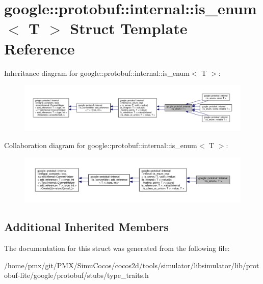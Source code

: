 \hypertarget{structgoogle_1_1protobuf_1_1internal_1_1is__enum}{}\section{google\+:\+:protobuf\+:\+:internal\+:\+:is\+\_\+enum$<$ T $>$ Struct Template Reference}
\label{structgoogle_1_1protobuf_1_1internal_1_1is__enum}


Inheritance diagram for google\+:\+:protobuf\+:\+:internal\+:\+:is\+\_\+enum$<$ T $>$\+:
\nopagebreak
\begin{figure}[H]
\begin{center}
\leavevmode
\includegraphics[width=350pt]{structgoogle_1_1protobuf_1_1internal_1_1is__enum__inherit__graph}
\end{center}
\end{figure}


Collaboration diagram for google\+:\+:protobuf\+:\+:internal\+:\+:is\+\_\+enum$<$ T $>$\+:
\nopagebreak
\begin{figure}[H]
\begin{center}
\leavevmode
\includegraphics[width=350pt]{structgoogle_1_1protobuf_1_1internal_1_1is__enum__coll__graph}
\end{center}
\end{figure}
\subsection*{Additional Inherited Members}


The documentation for this struct was generated from the following file\+:\begin{DoxyCompactItemize}
\item 
/home/pmx/git/\+P\+M\+X/\+Simu\+Cocos/cocos2d/tools/simulator/libsimulator/lib/protobuf-\/lite/google/protobuf/stubs/type\+\_\+traits.\+h\end{DoxyCompactItemize}
